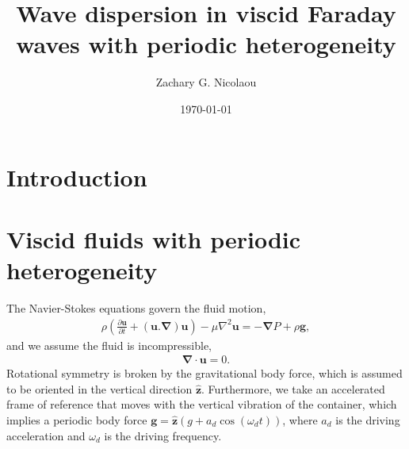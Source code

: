 \documentclass[aps,pre,amsmath,amssymb,floatfix,onecolumn,notitlepage,10pt]{revtex4-1}
\begin{document}
\title{Wave dispersion in viscid Faraday waves with periodic heterogeneity}
\author{Zachary G. Nicolaou}
\date{\today}

\maketitle
\tableofcontents

\section{Introduction}

\section{Viscid fluids with periodic heterogeneity}
The Navier-Stokes equations govern the fluid motion,
\begin{align}
\rho \left(\frac{\partial \mathbf{u}}{\partial t} + (\mathbf{u}.\bm{\nabla})\mathbf{u}\right) - \mu \nabla^2 \mathbf{u} = -\bm{\nabla}P + \rho \mathbf{g}, \label{ns}
\end{align}
and we assume the fluid is incompressible,
\begin{align}
\bm{\nabla} \cdot \mathbf{u} = 0. \label{incompressible}
\end{align}
Rotational symmetry is broken by the gravitational body force, which is assumed to be oriented in the vertical direction $\hat{\mathbf{z}}$. Furthermore, we take an accelerated frame of reference that moves with the vertical vibration of the container, which implies a periodic body force $\mathbf{g} = \hat{\mathbf{z}}(g + a_d\cos(\omega_d t))$, where $a_d$ is the driving acceleration and $\omega_d$ is the driving frequency.
\end{document}
